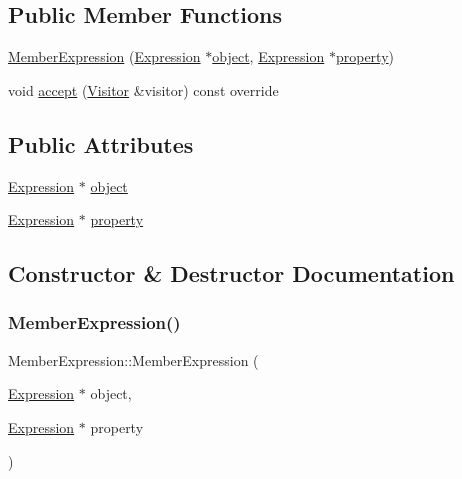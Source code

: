 \subsection*{Public Member Functions}
\begin{DoxyCompactItemize}
\item 
\hyperlink{struct_member_expression_a9a3eaa90cb6280ad3e221694632c22f5}{Member\+Expression} (\hyperlink{struct_expression}{Expression} $\ast$\hyperlink{struct_member_expression_a338f9515daed926c07fd717b9b728f58}{object}, \hyperlink{struct_expression}{Expression} $\ast$\hyperlink{struct_member_expression_a7b33bb4629162523bddbb397b180e31e}{property})
\item 
void \hyperlink{struct_member_expression_a04c3360eda4db02e733746882830b92c}{accept} (\hyperlink{struct_visitor}{Visitor} \&visitor) const override
\end{DoxyCompactItemize}
\subsection*{Public Attributes}
\begin{DoxyCompactItemize}
\item 
\hyperlink{struct_expression}{Expression} $\ast$ \hyperlink{struct_member_expression_a338f9515daed926c07fd717b9b728f58}{object}
\item 
\hyperlink{struct_expression}{Expression} $\ast$ \hyperlink{struct_member_expression_a7b33bb4629162523bddbb397b180e31e}{property}
\end{DoxyCompactItemize}


\subsection{Constructor \& Destructor Documentation}
\mbox{\label{struct_member_expression_a9a3eaa90cb6280ad3e221694632c22f5}} 
\subsubsection{\texorpdfstring{Member\+Expression()}{MemberExpression()}}
{\footnotesize\ttfamily Member\+Expression\+::\+Member\+Expression (\begin{DoxyParamCaption}\item[{\hyperlink{struct_expression}{Expression} $\ast$}]{object,  }\item[{\hyperlink{struct_expression}{Expression} $\ast$}]{property }\end{DoxyParamCaption})\hspace{0.3cm}{\ttfamily [inline]}}



